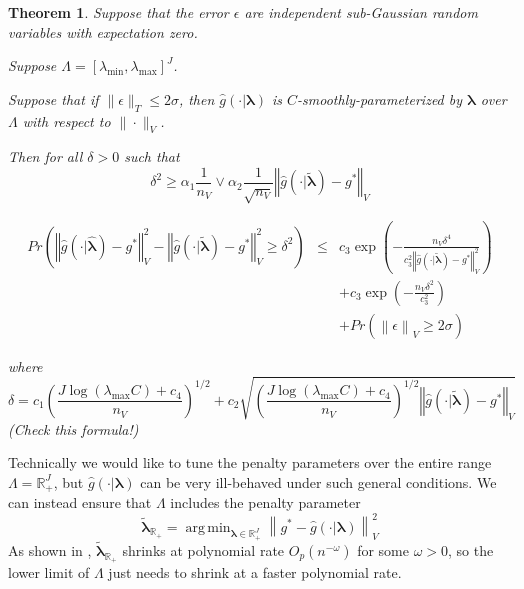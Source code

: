 \documentclass[12pt]{article}
\newtheorem{theorem}{Theorem}
\DeclareMathOperator*{\argmin}{arg\,min}
\begin{document}
\begin{theorem}
\label{train_val_thrm}
Suppose that the error $\epsilon$ are independent sub-Gaussian random variables with expectation zero.

Suppose $\Lambda=[\lambda_{\min},\lambda_{\max}]^{J}$.

Suppose that if $\|\epsilon\|_{T}\le 2\sigma$, then $\hat g (\cdot |\boldsymbol{\lambda} )$ is $C$-smoothly-parameterized by $\boldsymbol{\lambda}$ over $\Lambda$ with respect to $\| \cdot \|_V$.


Then for all $\delta > 0$ such that
\begin{equation}
\delta^{2}\ge\alpha_{1}\frac{1}{n_{V}}\vee\alpha_{2}\frac{1}{\sqrt{n_{V}}}\left\Vert \hat{g}\left (\cdot | \tilde{\boldsymbol{\lambda}} \right )-g^{*}\right\Vert _{V}
\end{equation}

\begin{eqnarray*}
	Pr\left(
	\left\Vert \hat{g}(\cdot|\hat{\boldsymbol{\lambda}})-g^{*}\right\Vert _{V}^2 -
	\left\Vert \hat{g}(\cdot|\tilde{\boldsymbol{\lambda}})-g^{*}\right\Vert _{V}^2
	\ge\delta^2
	\right )
	&\le& c_{3}\exp\left(-\frac{n_{V}\delta^{4}}{c_{3}^{2}\left\Vert  \hat{g}(\cdot|\tilde{\boldsymbol{\lambda}})-g^{*}\right\Vert _{V}^{2}}\right) \\
	&& +c_{3}\exp\left(-\frac{n_{V}\delta^{2}}{c_{3}^{2}}\right) \\
	&& +Pr \left (
	\left \| \epsilon \right \|_V \ge 2\sigma
	\right )
\end{eqnarray*}


where 
\[
\delta = c_1 \left(
	\frac{
		J \log (\lambda_{\max}C)+c_{4}
	}{n_V}
\right)^{1/2}+c_{2}
\sqrt{\left(
	\frac{
		J\log(\lambda_{\max}C)+c_{4}
	}{n_{V}}
\right)^{1/2}
\left\Vert \hat{g}(\cdot|\tilde{\boldsymbol{\lambda}})-g^{*}\right\Vert _{V}}
\] (Check this formula!)
\end{theorem}

Technically we would like to tune the penalty parameters over the entire range $\Lambda = \mathbb{R}^J_+$, but $\hat g(\cdot | \boldsymbol{\lambda})$ can be very ill-behaved under such general conditions. We can instead ensure that $\Lambda$ includes the penalty parameter
\begin{equation}
\label{eq:true_oracle}
\tilde{\boldsymbol{\lambda}}_{\mathbb{R}_+}
= \argmin_{\boldsymbol{\lambda} \in \mathbb{R}^J_+}\left \| g^* - \hat{g}(\cdot | \boldsymbol \lambda) \right \|^2_V
\end{equation}
As shown in \citet{van2000empirical}, $\tilde{\boldsymbol{\lambda}}_{\mathbb{R}_+}$ shrinks at polynomial rate $O_p(n^{-\omega})$ for some $\omega>0$, so the lower limit of $\Lambda$ just needs to shrink at a faster polynomial rate.
\end{document}
